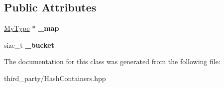 \subsection*{Public Attributes}
\begin{DoxyCompactItemize}
\item 
\hypertarget{classemlib_1_1_hash_map_1_1iterator_ac7fc941bccf75991d28dd9add54f1dfe}{\hyperlink{classemlib_1_1_hash_map}{My\+Type} $\ast$ {\bfseries \+\_\+map}}\label{classemlib_1_1_hash_map_1_1iterator_ac7fc941bccf75991d28dd9add54f1dfe}

\item 
\hypertarget{classemlib_1_1_hash_map_1_1iterator_ab296237c255b76c699594673d42d1fcd}{size\+\_\+t {\bfseries \+\_\+bucket}}\label{classemlib_1_1_hash_map_1_1iterator_ab296237c255b76c699594673d42d1fcd}

\end{DoxyCompactItemize}


The documentation for this class was generated from the following file\+:\begin{DoxyCompactItemize}
\item 
third\+\_\+party/Hash\+Containers.\+hpp\end{DoxyCompactItemize}
